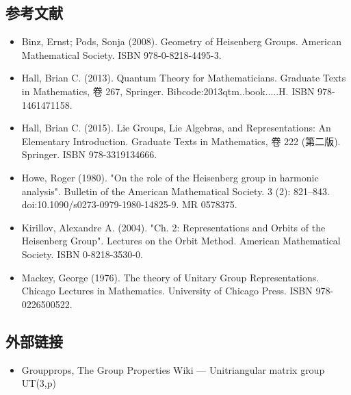 \subsection{参考文献}
\begin{itemize}
\item Binz, Ernst; Pods, Sonja (2008). Geometry of Heisenberg Groups. American Mathematical Society. ISBN 978-0-8218-4495-3.
\item Hall, Brian C. (2013). Quantum Theory for Mathematicians. Graduate Texts in Mathematics, 卷 267, Springer. Bibcode:2013qtm..book.....H. ISBN 978-1461471158.
\item Hall, Brian C. (2015). Lie Groups, Lie Algebras, and Representations: An Elementary Introduction. Graduate Texts in Mathematics, 卷 222 (第二版). Springer. ISBN 978-3319134666.
\item Howe, Roger (1980). "On the role of the Heisenberg group in harmonic analysis". Bulletin of the American Mathematical Society. 3 (2): 821–843. doi:10.1090/s0273-0979-1980-14825-9. MR 0578375.
\item Kirillov, Alexandre A. (2004). "Ch. 2: Representations and Orbits of the Heisenberg Group". Lectures on the Orbit Method. American Mathematical Society. ISBN 0-8218-3530-0.
\item Mackey, George (1976). The theory of Unitary Group Representations. Chicago Lectures in Mathematics. University of Chicago Press. ISBN 978-0226500522.
\end{itemize}
\subsection{外部链接}
\begin{itemize}
\item Groupprops, The Group Properties Wiki — Unitriangular matrix group UT(3,p)
\end{itemize}

